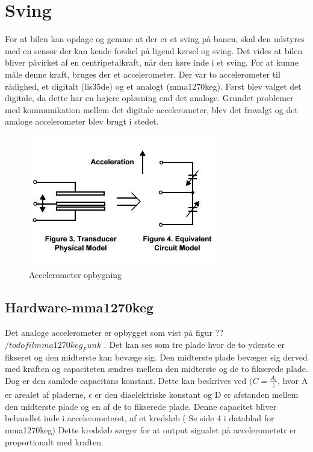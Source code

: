 \section{Sving}
For at bilen kan opdage og  gemme at der er et sving på banen, skal den udstyres med en sensor der kan kende forskel på ligeud kørsel og sving. Det vides at bilen bliver påvirket af en centripetalkraft, når den køre inde i et sving. For at kunne måle denne kraft, bruges der et accelerometer. Der var to accelerometer til rådighed, et digitalt (lis35de) og et analogt (mma1270keg). Først blev valget det digitale, da dette har en højere opløsning end det analoge. Grundet problemer med kommunikation mellem det digitale accelerometer, blev det fravalgt og det analoge accelerometer blev brugt i stedet.

\begin{figure}
\center
\includegraphics[scale=0.4]{./Graphics/Acceleration}
\caption{Accelerometer opbygning}
\label{Acceleration}
\end{figure}

\subsection{Hardware-mma1270keg}
Det analoge accelerometer er opbygget som vist på figur ?? $/todo{fil mma1270keg_Funk}$ . Det kan ses som tre plade hvor de to yderste er fikseret og den midterste kan bevæge sig.  Den midterste plade bevæger sig derved med kraften og capaciteten ændres mellem den midterste og de to fikserede plade. Dog er den samlede capacitans konstant. Dette kan beskrives ved $(C=\frac{A_{\epsilon}})$, hvor A er arealet af pladerne, $\epsilon$ er den diaelektriske konstant og D er afstanden mellem den midterste plade og en af de to fikserede plade. Denne capacitet bliver behandlet inde i accelerometeret, af et kredsløb ( Se side 4 i datablad for mma1270keg) Dette kredsløb sørger for at output signalet på accelerometetr er proportionalt med kraften.

